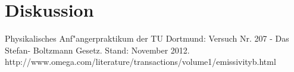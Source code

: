 \newpage
\section{Diskussion}

\begin{thebibliography}{9}
	 Physikalisches Anf"angerpraktikum der TU Dortmund: Versuch Nr. 207 - Das Stefan- Boltzmann Gesetz. Stand: November 2012.
	 http://www.omega.com/literature/transactions/volume1/emissivityb.html
\end{thebibliography}